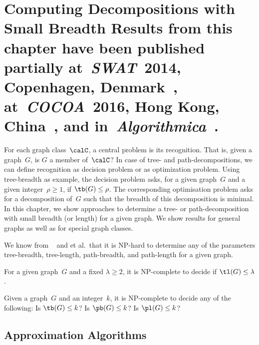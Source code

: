 \chapter
[%
    Computing Decompositions with Small Breadth%
]
{%
    Computing Decompositions with Small Breadth%
    \chapterNote
    {
        Results from this chapter have been published partially
        at~\emph{SWAT}~2014, Copenhagen, Denmark~\cite{DragKoehLeit2014},
        at~\emph{COCOA}~2016, Hong Kong, China~\cite{LeiterDragan2016}, and
        in~\emph{Algorithmica}~\cite{DragKoehLeit2017}.
    }%
}
\label{cha:compDeco}
%

For each graph class~$\calC$, a central problem is its recognition.
That is, given a graph~$G$, is $G$ a member of~$\calC$?
In case of tree- and path-decompositions, we can define recognition as decision problem or as optimization problem.
Using tree-breadth as example, the decision problem asks, for a given graph~$G$ and a given integer~$\rho \geq 1$, if $\tb(G) \leq \rho$.
The corresponding optimisation problem asks for a decomposition of~$G$ such that the breadth of this decomposition is minimal.
In this chapter, we show approaches to determine a tree- or path-decomposition with small breadth (or length) for a given graph.
We show results for general graphs as well as for special graph classes.

We know from ~\cite{Lokshtanov2010} and  et al.\,\cite{DucoLegaNiss2016} that it is NP-hard to determine any of the parameters tree-breadth, tree-length, path-breadth, and path-length for a given graph.

\begin{theorem}
    \label{theo:TreeLengthNPc}
For a given graph~\( G \) and a fixed \( \lambda \geq 2 \), it is NP-complete to decide if \( \tl(G) \leq \lambda \).
\end{theorem}

\begin{theorem}
Given a graph~\( G \) and an integer~\( k \), it is NP-complete to decide any of the following:
Is \( \tb(G) \leq k \)?
Is \( \pb(G) \leq k \)?
Is \( \pl(G) \leq k \)?
\end{theorem}


\section{Approximation Algorithms}

